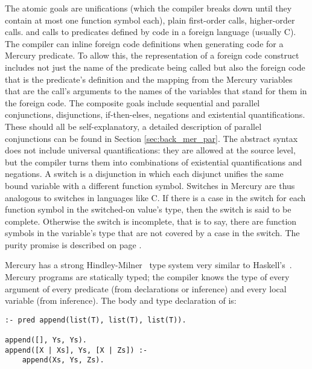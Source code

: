 \noindent
The atomic goals are unifications
(which the compiler breaks down until they contain
at most one function symbol each),
plain first-order calls,
higher-order calls.
and calls to predicates defined by code in a foreign language (usually C).
The compiler can inline foreign code definitions when generating code
for a Mercury predicate.
To allow this, the representation of a foreign code construct includes
not just the name of the predicate being called
but also the foreign code that is the predicate's definition
and the mapping from the Mercury variables that are the call's arguments
to the names of the variables that stand for them in the foreign code.
The composite goals include
sequential and parallel conjunctions,
disjunctions, if-then-elses, negations and existential quantifications.
These should all be self-explanatory,
a detailed description of parallel conjunctions can be found in Section
\ref{sec:back_mer_par}.
The abstract syntax does not include universal quantifications:
they are allowed at the source level,
but the compiler turns them into
combinations of existential quantifications and negations.
A switch is a disjunction in which
each disjunct unifies the same bound variable
with a different function symbol.
Switches in Mercury are thus analogous to switches in languages like C.
If there is a case in the switch for each function symbol in the
switched-on value's type, then the switch is said to be complete.
Otherwise the switch is incomplete,
that is to say,
there are function symbols in the variable's type that are not covered
by a case in the switch.
The purity promise is described on page \pageref{page:purity}.

Mercury has a strong Hindley-Milner~\citep{hindly69:types,milner78:types} type
system very similar to Haskell's~\citep{haskell98}.
Mercury programs are statically typed; the compiler knows the type of every
argument of every predicate (from declarations or inference) and every local
variable (from inference).
The body and type declaration of  is:

\begin{verbatim}
:- pred append(list(T), list(T), list(T)).

append([], Ys, Ys).
append([X | Xs], Ys, [X | Zs]) :-
    append(Xs, Ys, Zs).
\end{verbatim}

